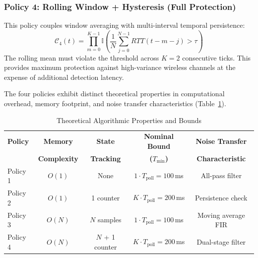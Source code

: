 \documentclass[conference]{IEEEtran}
\begin{document}
{\subsubsection{Policy 4: Rolling Window + Hysteresis (Full Protection)}
This policy couples window averaging with multi-interval temporal persistence:
\begin{equation}
\mathcal{C}_{4}(t) = \prod_{m=0}^{K-1} \mathbb{I}\left( \frac{1}{N}\sum_{j=0}^{N-1} RTT(t - m - j) > \tau \right)
\end{equation}
The rolling mean must violate the threshold across $K=2$ consecutive ticks. This provides maximum protection against high-variance wireless channels at the expense of additional detection latency.

The four policies exhibit distinct theoretical properties in computational overhead, memory footprint, and noise transfer characteristics (Table~\ref{tab:theoretical_bounds}).

\begin{table}[htbp]
\caption{Theoretical Algorithmic Properties and Bounds}
\label{tab:theoretical_bounds}
\centering
\begin{tabular}{lcccc}
\toprule
\textbf{Policy} & \textbf{Memory} & \textbf{State} & \textbf{Nominal Bound} & \textbf{Noise Transfer} \\
& \textbf{Complexity} & \textbf{Tracking} & \textbf{($T_{\text{min}}$)} & \textbf{Characteristic} \\
\midrule
Policy 1 & $O(1)$ & None & $1 \cdot T_{\text{poll}} = 100$\,ms & All-pass filter \\
Policy 2 & $O(1)$ & 1 counter & $K \cdot T_{\text{poll}} = 200$\,ms & Persistence check \\
Policy 3 & $O(N)$ & $N$ samples & $1 \cdot T_{\text{poll}} = 100$\,ms & Moving average FIR \\
Policy 4 & $O(N)$ & $N$ + 1 counter & $K \cdot T_{\text{poll}} = 200$\,ms & Dual-stage filter \\
\bottomrule
\end{tabular}
\end{table}
}
\end{document}
